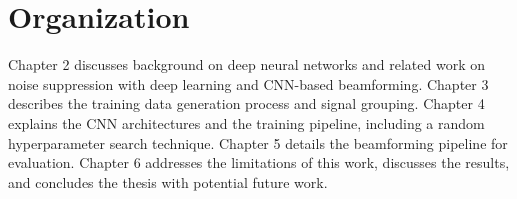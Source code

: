 \section{Organization}
Chapter 2 discusses background on deep neural networks and related work on noise suppression with deep learning and CNN-based beamforming. Chapter 3 describes the training data generation process and signal grouping. Chapter 4 explains the CNN architectures and the training pipeline, including a random hyperparameter search technique. Chapter 5 details the beamforming pipeline for evaluation. Chapter 6 addresses the limitations of this work, discusses the results, and concludes the thesis with potential future work.

